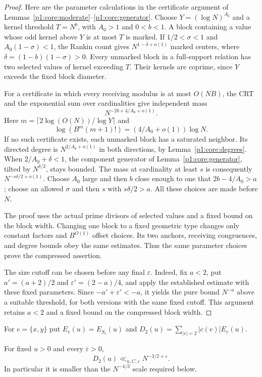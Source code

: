 \begin{proof}
Here are the parameter calculations in the certificate argument of
Lemmas~\ref{p1:core:moderate}--\ref{p1:core:generator}.
Choose $Y=(\log N)^{A_0}$ and a kernel threshold $T=N^b$, with
$A_0>1$ and $0<b<1$. A block containing a value whose odd kernel above
$Y$ is at most $T$ is marked. If
$1/2<\sigma<1$ and $A_0(1-\sigma)<1$, the Rankin count gives
$N^{1-\delta+o(1)}$ marked centers, where
$\delta=(1-b)(1-\sigma)>0$.
Every unmarked block in a full-support relation has two selected
values of kernel exceeding $T$. Their kernels are coprime, since
$Y$ exceeds the fixed block diameter.

For a certificate in which every receiving modulus is at most $O(NB)$,
the CRT and the exponential sum over cardinalities give independent
mass
\[
 N^{-2b+4/A_0+o(1)}.
\]
Here $m=\lceil2\log(O(N))/\log Y\rceil$ and
\[
 \log(B^m(m+1)!)=(4/A_0+o(1))\log N.
\]
If no such certificate exists, each unmarked block has a saturated
neighbor. Its directed degree is $N^{2/A_0+o(1)}$ in both directions,
by Lemma~\ref{p1:core:degrees}.
When $2/A_0+\delta<1$, the component generator of
Lemma~\ref{p1:core:generator}, tilted by $N^{\delta/2}$, stays bounded.
The mass at cardinality at least $s$ is consequently
$N^{-s\delta/2+o(1)}$.
Choose $A_0$ large and then $b$ close enough to one that
$2b-4/A_0>a$; choose an allowed $\sigma$ and then $s$ with
$s\delta/2>a$. All these choices are made before $N$.

The proof uses the actual prime divisors of selected values and a fixed
bound on the block width. Changing one block to a fixed geometric type
changes only constant factors and $B^{O(1)}$ offset choices. Its two
anchors, receiving congruences, and degree bounds obey the same estimates.
Thus the same parameter choices prove the compressed assertion.

The size cutoff can be chosen before any final $\varepsilon$.
Indeed, fix $a<2$, put $a'=(a+2)/2$ and
$\varepsilon'=(2-a)/4$, and apply the established estimate with
these fixed parameters. Since $-a'+\varepsilon'<-a$, it yields the
pure bound $N^{-a}$ above a suitable threshold, for both versions
with the same fixed cutoff. This argument retains $a<2$ and a fixed
bound on the compressed block width.
\end{proof}

For $e=\{x,y\}$ put $E_e(u)=E_{S_e}(u)$ and
$D_2(u)=\sum_{|e|=2}|c(e)|E_e(u)$.

\begin{proposition}
\label{p13:transfer:pair-deficit}
For fixed $u>0$ and every $\varepsilon>0$,
\begin{equation}
 D_2(u)\ll_{u,C,\varepsilon}N^{-3/2+\varepsilon}.
 \label{p13:transfer:pair-deficit-bound}
\end{equation}
In particular it is smaller than the $N^{-4/3}$ scale required below.
\end{proposition}

